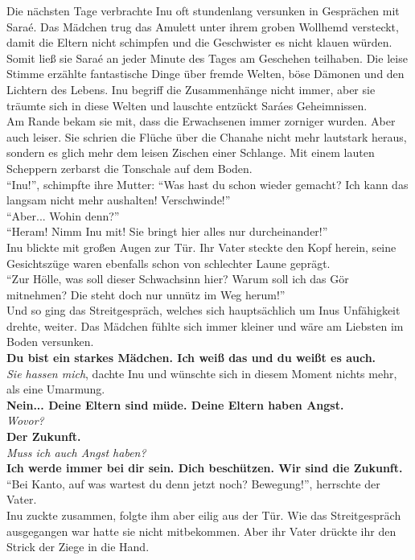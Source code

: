 \documentclass[a4paper,12pt]{book}
\begin{document}
Die nächsten Tage verbrachte Inu oft stundenlang versunken in Gesprächen mit Saraé. Das Mädchen 
trug das Amulett unter ihrem groben Wollhemd versteckt, damit die Eltern nicht schimpfen und die 
Geschwister es nicht klauen würden. Somit ließ sie Saraé an jeder Minute des Tages am Geschehen 
teilhaben. Die leise Stimme erzählte fantastische Dinge über fremde Welten, böse Dämonen und den 
Lichtern des Lebens. Inu begriff die Zusammenhänge nicht immer, aber sie träumte sich in diese 
Welten und lauschte entzückt Saráes Geheimnissen.\\
Am Rande bekam sie mit, dass die Erwachsenen immer zorniger wurden. Aber auch leiser. Sie schrien 
die Flüche über die Chanahe nicht mehr lautstark heraus, sondern es glich mehr dem leisen Zischen 
einer Schlange. Mit einem lauten Scheppern zerbarst die Tonschale auf dem Boden.\\
``Inu!'', schimpfte ihre Mutter: ``Was hast du schon wieder gemacht? Ich kann das langsam nicht 
mehr aushalten! Verschwinde!''\\
``Aber... Wohin denn?''\\
``Heram! Nimm Inu mit! Sie bringt hier alles nur durcheinander!''\\
Inu blickte mit großen Augen zur Tür. Ihr Vater steckte den Kopf herein, seine Gesichtszüge waren 
ebenfalls schon von schlechter Laune geprägt.\\
``Zur Hölle, was soll dieser Schwachsinn hier? Warum soll ich das Gör mitnehmen? Die steht doch nur 
unnütz im Weg herum!''\\
Und so ging das Streitgespräch, welches sich hauptsächlich um Inus Unfähigkeit drehte, weiter. Das 
Mädchen fühlte sich immer kleiner und wäre am Liebsten im Boden versunken.\\
\textbf{Du bist ein starkes Mädchen. Ich weiß das und du weißt es auch.}\\
\textit{Sie hassen mich}, dachte Inu und wünschte sich in diesem Moment nichts mehr, als eine 
Umarmung.\\
\textbf{Nein... Deine Eltern sind müde. Deine Eltern haben Angst.}\\
\textit{Wovor?}\\
\textbf{Der Zukunft.}\\
\textit{Muss ich auch Angst haben?}\\
\textbf{Ich werde immer bei dir sein. Dich beschützen. Wir sind die Zukunft.}\\
``Bei Kanto, auf was wartest du denn jetzt noch? Bewegung!'', herrschte der Vater.\\
Inu zuckte zusammen, folgte ihm aber eilig aus der Tür. Wie das Streitgespräch ausgegangen war 
hatte sie nicht mitbekommen. Aber ihr Vater drückte ihr den Strick der Ziege in die Hand. \\
\end{document}
